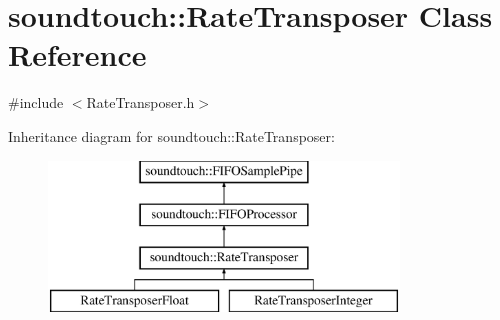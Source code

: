 \hypertarget{classsoundtouch_1_1_rate_transposer}{}\section{soundtouch\+:\+:Rate\+Transposer Class Reference}
\label{classsoundtouch_1_1_rate_transposer}


{\ttfamily \#include $<$Rate\+Transposer.\+h$>$}

Inheritance diagram for soundtouch\+:\+:Rate\+Transposer\+:\begin{figure}[H]
\begin{center}
\leavevmode
\includegraphics[height=4.000000cm]{classsoundtouch_1_1_rate_transposer}
\end{center}
\end{figure}

